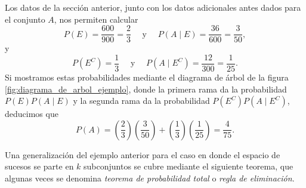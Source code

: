 Los datos de la sección anterior, junto con los datos adicionales antes dados para el conjunto $A$, nos permiten calcular
$$P(E) = \frac{600}{900} = \frac{2}{3} \quad \text{ y } \quad P(A \mid E) = \frac{36}{600} = \frac{3}{50},$$
y
$$P\left(E^C\right) = \frac{1}{3} \quad \text{ y } \quad P\left(A \mid E^C\right) = \frac{12}{300} = \frac{1}{25}.$$
Si mostramos estas probabilidades mediante el diagrama de árbol de la figura \ref{fig:diagrama_de_arbol_ejemplo}, donde la primera rama da la probabilidad $P(E)P(A \mid E)$ y la segunda rama da la probabilidad $P\left(E^C\right) P\left(A \mid E^C\right)$, deducimos que\newpage
$$P(A) = \left( \frac{2}{3} \right) \left( \frac{3}{50} \right) + \left( \frac{1}{3} \right) \left( \frac{1}{25} \right) = \frac{4}{75}.$$

Una generalización del ejemplo anterior para el caso en donde el espacio de sucesos
se parte en $k$ subconjuntos se cubre mediante el siguiente teorema, que algunas veces se denomina \emph{teorema de probabilidad total} o \emph{regla de eliminación}.

